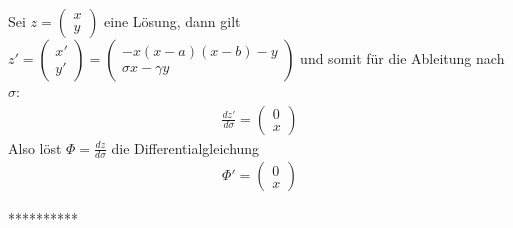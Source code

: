 \begin{solution}
\begin{enumerate}[label = \textbf{\alph*)}]
Sei $z = \begin{pmatrix}
  x \\ y
\end{pmatrix}$ eine Lösung, dann gilt $z' = \begin{pmatrix}
  x' \\ y'
\end{pmatrix} = \begin{pmatrix}
  -x(x-a)(x-b)-y \\ \sigma x - \gamma y
\end{pmatrix}$ und somit für die Ableitung nach $\sigma$:
\begin{align*}
\frac{dz'}{d\sigma} = \begin{pmatrix}
  0 \\ x
\end{pmatrix}
\end{align*}
Also löst $\Phi = \frac{dz}{d\sigma}$ die Differentialgleichung
\begin{align*}
  \Phi' = \begin{pmatrix}
    0 \\ x
  \end{pmatrix}
\end{align*}

**********


\end{enumerate}
\end{solution}

